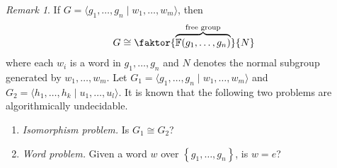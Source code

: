 \documentclass[10pt,letterpaper,cm]{nupset}
\theoremstyle{definition}
\theoremstyle{theorem}
\theoremstyle{remark}
\newtheorem{remark}[definition]{Remark}
\newcommand{\F}{\mathbb F}
\newcommand{\1}{\mathbb{1}}
\newcommand{\0}{\vec 0}
\begin{document}
\begin{remark} If $G = \langle g_1, \ldots, g_n \mid w_1, \ldots, w_m \rangle$, then $$G \cong \faktor{\overbrace{\F(g_1, \ldots, g_n)}^{\text{free group}}}{N}$$ where  each $w_i$ is a word in $g_1, \ldots, g_n$ and $N$ denotes the normal subgroup generated by $w_1, \ldots, w_m$.
Let $G_1 = \langle g_1, \ldots, g_n \mid w_1, \ldots, w_m \rangle$ and $G_2 = \langle h_1, \ldots, h_k \mid u_1, \ldots, u_l \rangle$.
It is known that the following two problems are algorithmically undecidable.
\begin{enumerate}[label=(\alph*)]
\item{\textit{Isomorphism problem.}} Is $G_1 \cong G_2$?
\item {\textit{Word problem.}} Given a word $w$ over $\left\{g_1, \ldots, g_n\right\}$, is $w=e$? 
\end{enumerate}
\end{remark}

\bigskip
\end{document}
